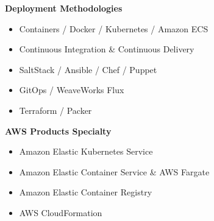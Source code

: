 \textbf{Deployment Methodologies} \\
\vspace{-2mm}
\begin{itemize} \itemsep 0pt
    \item Containers / Docker / Kubernetes / Amazon ECS
    \item Continuous Integration \& Continuous Delivery
    \item SaltStack / Ansible / Chef / Puppet
    \item GitOps / WeaveWorks Flux
    \item Terraform / Packer
\end{itemize}

\textbf{AWS Products Specialty} \\
\vspace{-2mm}
\begin{itemize} \itemsep 0pt
    \item Amazon Elastic Kubernetes Service
    \item Amazon Elastic Container Service \& AWS Fargate
    \item Amazon Elastic Container Registry
    \item AWS CloudFormation
\end{itemize}